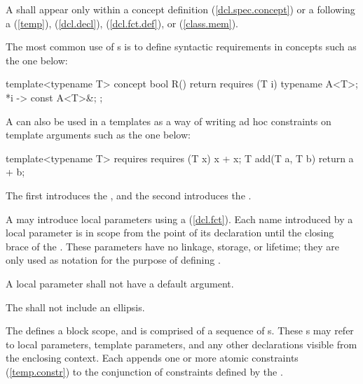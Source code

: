 \pnum
A  shall appear
only within a concept definition (\ref{dcl.spec.concept}) 
or a  following a
(\ref{temp}),
(\ref{dcl.decl}),
(\ref{dcl.fct.def}), or
(\ref{class.mem}).

\enterexample
The most common use of 
s is to define
syntactic requirements in concepts  
such as the one below:
\begin{codeblock}
template<typename T>
  concept bool R() {
    return requires (T i) {
      typename A<T>;
      {*i} -> const A<T>&;
    };
  }
\end{codeblock}
A  can also be
used in a  templates 
as a way of writing ad hoc constraints on template arguments such as 
the one below:
\begin{codeblock}
template<typename T>
  requires requires (T x) { x + x; }
    T add(T a, T b) { return a + b; }
    \end{codeblock}
The first  introduces the 
, and the second
introduces the .
\exitexample


\pnum
A  may introduce
local parameters using a 
(\ref{dcl.fct}). 
% 
Each name introduced by a local parameter is in scope from the point
of its declaration until the closing brace of the
.
% 
These parameters have no linkage, storage, or lifetime; they are only used
as notation for the purpose of defining 
. 

\pnum
A local parameter shall not have a default argument.

\pnum
The  shall
not include an ellipsis.

\pnum
The  defines a
block scope, and is comprised of a sequence of 
s.
% 
These s may refer to local 
parameters, template parameters, and any other declarations visible from the 
enclosing context. 
% 
Each  appends one or more atomic constraints
(\ref{temp.constr}) to the conjunction of constraints defined by the
.


